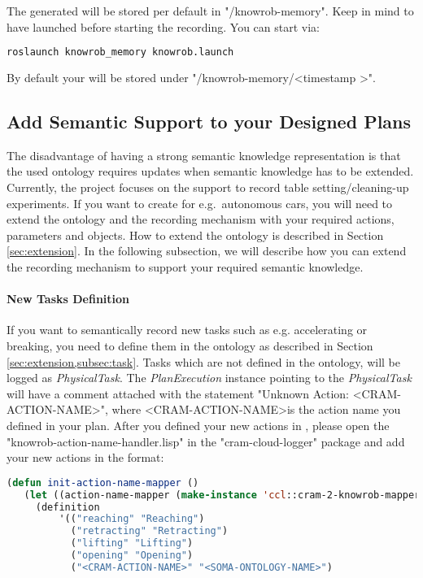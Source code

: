 The generated \neem will be stored per default in "\raisebox{-0.9ex}{\~{}}/knowrob-memory".
Keep in mind to  have \knowrob launched before starting the \neem recording. 
You can start \knowrob via:

\begin{lstlisting}[language=bash, caption=How to Start \knowrob]
	roslaunch knowrob_memory knowrob.launch
\end{lstlisting}

By default your \neem will be stored under "\raisebox{-0.9ex}{\~{}}/knowrob-memory/\textless timestamp \textgreater".


\subsection{Add Semantic Support to your Designed Plans}
The disadvantage of having a strong semantic knowledge representation is that the used ontology requires updates when semantic knowledge has to be extended. 
Currently, the \ease project focuses on the support to record table setting/cleaning-up experiments.
If you want to create \neems for e.g.\ autonomous cars, you will need to extend the \soma ontology and the recording mechanism with your required actions, parameters and objects.
How to extend the \soma ontology is described in Section \ref{sec:extension}.
In the following subsection, we will describe how you can extend the \cram recording mechanism to support your required semantic knowledge.

\paragraph{New Tasks Definition}
If you want to semantically record new tasks such as e.g. accelerating or breaking, you need to define them in the ontology as described in Section \ref{sec:extension,subsec:task}.
Tasks which are not defined in the ontology, will be logged as \textit{PhysicalTask}.
The \textit{PlanExecution} instance pointing to the \textit{PhysicalTask} will have a comment attached with the statement "Unknown Action: \textless CRAM-ACTION-NAME\textgreater", where \textless CRAM-ACTION-NAME\textgreater is the action name you defined in your plan.
After you defined your new actions in \soma, please open the "knowrob-action-name-handler.lisp" in the "cram-cloud-logger" package and add your new actions in the format:

\begin{lstlisting}[language=lisp, caption=Linking the CRAM Action to the Ontology Concept]
(defun init-action-name-mapper ()
   (let ((action-name-mapper (make-instance 'ccl::cram-2-knowrob-mapper))
     (definition
         '(("reaching" "Reaching")
           ("retracting" "Retracting")
           ("lifting" "Lifting")
           ("opening" "Opening")
           ("<CRAM-ACTION-NAME>" "<SOMA-ONTOLOGY-NAME>")
\end{lstlisting}

